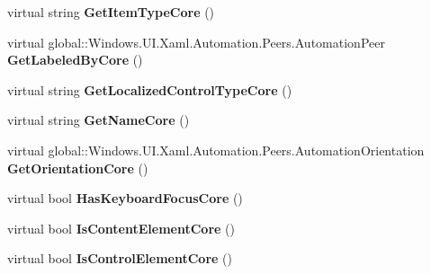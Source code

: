 \begin{DoxyCompactItemize}
virtual string {\bfseries Get\+Item\+Type\+Core} ()
\item 
\mbox{\label{class_windows_1_1_u_i_1_1_xaml_1_1_automation_1_1_peers_1_1_automation_peer_a7b381b450ce7bad769a25c534aecc3a7}} 
virtual global\+::\+Windows.\+U\+I.\+Xaml.\+Automation.\+Peers.\+Automation\+Peer {\bfseries Get\+Labeled\+By\+Core} ()
\item 
\mbox{\label{class_windows_1_1_u_i_1_1_xaml_1_1_automation_1_1_peers_1_1_automation_peer_a102feaeb60241a4b90e5215604402a40}} 
virtual string {\bfseries Get\+Localized\+Control\+Type\+Core} ()
\item 
\mbox{\label{class_windows_1_1_u_i_1_1_xaml_1_1_automation_1_1_peers_1_1_automation_peer_ab0c8c7ce6d1a49aca1d7cd572de76b25}} 
virtual string {\bfseries Get\+Name\+Core} ()
\item 
\mbox{\label{class_windows_1_1_u_i_1_1_xaml_1_1_automation_1_1_peers_1_1_automation_peer_a3d35fe79090d43f586705e1a5ee1b8c9}} 
virtual global\+::\+Windows.\+U\+I.\+Xaml.\+Automation.\+Peers.\+Automation\+Orientation {\bfseries Get\+Orientation\+Core} ()
\item 
\mbox{\label{class_windows_1_1_u_i_1_1_xaml_1_1_automation_1_1_peers_1_1_automation_peer_abaf7e76875c95ee1262a4a9500762de0}} 
virtual bool {\bfseries Has\+Keyboard\+Focus\+Core} ()
\item 
\mbox{\label{class_windows_1_1_u_i_1_1_xaml_1_1_automation_1_1_peers_1_1_automation_peer_a98815883cbd1140906d012ae6784cfd3}} 
virtual bool {\bfseries Is\+Content\+Element\+Core} ()
\item 
\mbox{\label{class_windows_1_1_u_i_1_1_xaml_1_1_automation_1_1_peers_1_1_automation_peer_a8cc43a11f2901efd882270d7e1ec196e}} 
virtual bool {\bfseries Is\+Control\+Element\+Core} ()

\end{DoxyCompactItemize}
